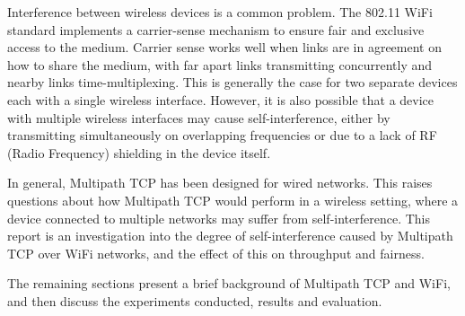 Interference between wireless devices is a common problem. The 802.11 WiFi
standard implements a carrier-sense mechanism to ensure fair and exclusive
access to the medium. Carrier sense works well when links are in agreement on 
how to share the medium, with far apart links transmitting concurrently and 
nearby links time-multiplexing. This is generally the case for two separate 
devices each with a single wireless interface. However, it is also possible that 
a device with multiple wireless interfaces may cause self-interference, either 
by transmitting simultaneously on overlapping frequencies or due to a lack of RF
(Radio Frequency) shielding in the device itself.

In general, Multipath TCP has been designed for wired networks. This raises
questions about how Multipath TCP would perform in a wireless setting, where a
device connected to multiple networks may suffer from self-interference. This
report is an investigation into the degree of self-interference caused by
Multipath TCP over WiFi networks, and the effect of this on throughput and
fairness.

The remaining sections present a brief background of Multipath TCP and WiFi, and
then discuss the experiments conducted, results and evaluation.
